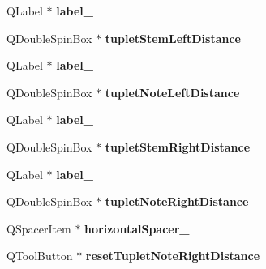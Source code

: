 \begin{DoxyCompactItemize}
\mbox{\label{class_ui___edit_style_base_a2360950b5c55927b198e1bdbd3e33238}} 
Q\+Label $\ast$ {\bfseries label\+\_}
\item 
\mbox{\label{class_ui___edit_style_base_ad64fc1054efb90a6a8d52a528699a3dc}} 
Q\+Double\+Spin\+Box $\ast$ {\bfseries tuplet\+Stem\+Left\+Distance}
\item 
\mbox{\label{class_ui___edit_style_base_a0541cbee2c9c918b732563a4993f0c51}} 
Q\+Label $\ast$ {\bfseries label\+\_}
\item 
\mbox{\label{class_ui___edit_style_base_aa7f332963b9ad7336ec75938eb87991c}} 
Q\+Double\+Spin\+Box $\ast$ {\bfseries tuplet\+Note\+Left\+Distance}
\item 
\mbox{\label{class_ui___edit_style_base_ad261f6607a814bd2eb283126721bfd40}} 
Q\+Label $\ast$ {\bfseries label\+\_}
\item 
\mbox{\label{class_ui___edit_style_base_a651211205bdc88aec5f3631e7dbbfa19}} 
Q\+Double\+Spin\+Box $\ast$ {\bfseries tuplet\+Stem\+Right\+Distance}
\item 
\mbox{\label{class_ui___edit_style_base_ad31aa9845953a1460bde5844eab278db}} 
Q\+Label $\ast$ {\bfseries label\+\_}
\item 
\mbox{\label{class_ui___edit_style_base_a3a8c661afa06c7922787d604437a47e6}} 
Q\+Double\+Spin\+Box $\ast$ {\bfseries tuplet\+Note\+Right\+Distance}
\item 
\mbox{\label{class_ui___edit_style_base_a7cc4b7147220837df1dd3bdf4928aef9}} 
Q\+Spacer\+Item $\ast$ {\bfseries horizontal\+Spacer\+\_}
\item 
\mbox{\label{class_ui___edit_style_base_a815fc417f1b235a91147c205e27eb107}} 
Q\+Tool\+Button $\ast$ {\bfseries reset\+Tuplet\+Note\+Right\+Distance}
\item 
\mbox{\label{class_ui___edit_style_base_a604e3acf5eddec89f1c058f5f657dcb9}} 

\end{DoxyCompactItemize}
